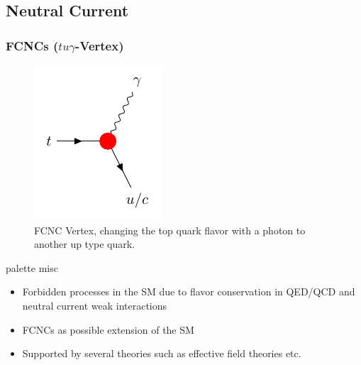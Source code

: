 \documentclass{beamer}
\begin{document}
\subsection{Neutral Current}
\begin{frame}[fragile]
\frametitle{FCNCs ($tu\gamma$-Vertex)}
\vspace{-3mm}
\begin{minipage}{0.48\textwidth}
	\begin{figure}
		\centering
		\includegraphics[width=0.6\linewidth]{images/tug-vertex.pdf}
	\caption{FCNC Vertex, changing the top quark flavor with a photon to another up type quark.}
	\end{figure}
\end{minipage}
\hfill
\begin{minipage}{0.48\textwidth}
	\begin{beamercolorbox}[rounded=true,shadow=true]{palette misc}
		\begin{itemize}
			\item Forbidden processes in the SM due to flavor conservation in QED/QCD and neutral current weak interactions 
			\item FCNCs as possible extension of the SM
			\item Supported by several theories such as 
			effective field theories etc.
		\end{itemize}
	\end{beamercolorbox}
\end{minipage}

\end{frame}
\end{document}
